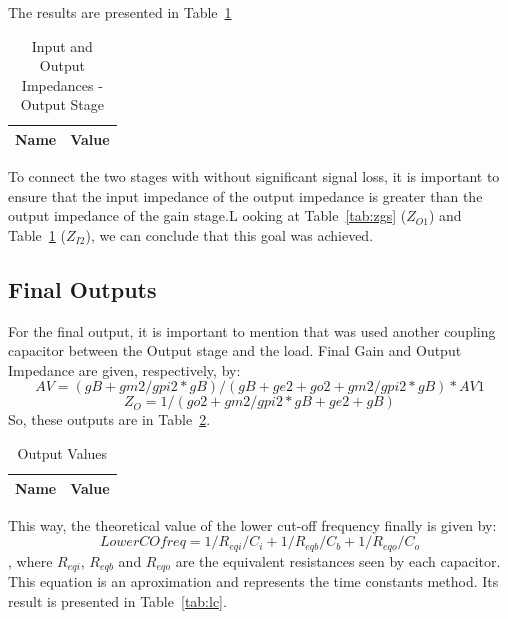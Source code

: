 The results are presented in Table~\ref{tab:osz}

\begin{table}[H]
  \centering
  \begin{tabular}{|l|r|}
     \hline    
    {\bf Name} & {\bf Value} \\ \hline   
    
  \end{tabular}
  \caption{Input and Output Impedances - Output Stage}
  \label{tab:osz}
\end{table}

To connect the two stages with without significant signal loss, it is important to ensure that the input impedance of the output impedance is greater than the output impedance of the gain stage.L ooking at Table~\ref{tab:zgs} ($Z_{O1}$) and Table~\ref{tab:osz} ($Z_{I2}$), we can conclude that this goal was achieved.

\subsection{Final Outputs}
For the final output, it is important to mention that was used another coupling capacitor between the Output stage and the load.
Final Gain and Output Impedance are given, respectively, by:
\begin{equation}
	AV=(gB+gm2/gpi2*gB)/(gB+ge2+go2+gm2/gpi2*gB)*AV1
\end{equation}
\begin{equation}
	Z_O=1/(go2+gm2/gpi2*gB+ge2+gB)
\end{equation}
So, these outputs are in Table~\ref{tab:finaltab}.
\begin{table}[H]
  \centering
  \begin{tabular}{|l|r|}
     \hline    
    {\bf Name} & {\bf Value} \\ \hline   
    
  \end{tabular}
  \caption{Output Values}
  \label{tab:finaltab}
\end{table}

This way, the theoretical value of the lower cut-off frequency finally is given by:
\begin{equation}
	Lower CO freq=1/R_{eqi}/C_i+1/R_{eqb}/C_b+1/R_{eqo}/C_o
\end{equation}
, where $R_{eqi}$, $R_{eqb}$ and $R_{eqo}$ are the equivalent resistances seen by each capacitor. This equation is an aproximation and represents the time constants method. Its result is presented in Table~\ref{tab:lc}.

